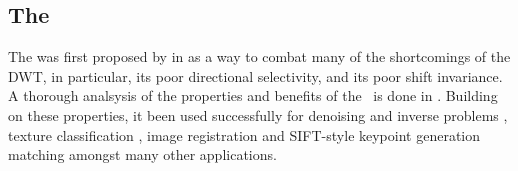 
% 
\subsection{The \DTCWT}
  The \DTCWT was first proposed by \citeauthor{kingsbury_dual-tree_1998} in
  \cite{kingsbury_dual-tree_1998, kingsbury_dual-tree_1998-1} as a way to combat
  many of the shortcomings of the DWT, in particular, its poor directional
  selectivity, and its poor shift invariance. A thorough analsysis of the
  properties and benefits of the \DTCWT\ is done in
  \cite{kingsbury_image_1999,selesnick_dual-tree_2005}. Building on these
  properties, it been used
  successfully for denoising and inverse problems \cite{rivaz_bayesian_2001,
  zhang_bayesian_2008, zhang_variational_2015, miller_image_2008}, texture
  classification \cite{hatipoglu_texture_1999, rivaz_complex_1999}, image
  registration \cite{loo_motion-estimation-based_2001, chen_efficient_2012}
  and
  SIFT-style keypoint generation matching \cite{fauqueur_multiscale_2006,
  anderson_determining_2005, anderson_rotation-invariant_2006,
  bendale_multiscale_2010, ng_robust_2012} amongst many other applications. 


